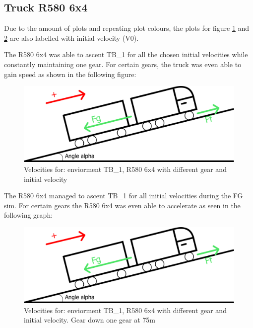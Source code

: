 \documentclass[noprint]{uit-thesis}
\begin{document}
\subsection{Truck R580 6x4}
Due to the amount of plots and repeating plot colours, the plots for figure \ref{fig:TB1_6x4} and \ref{fig:TB1_6x4_GR} are also labelled with initial velocity (V0). 
\par
The R580 6x4 was able to ascent TB\_1 for all the chosen initial velocities while constantly maintaining one gear. For certain gears, the truck was even able to gain speed as shown in the following figure:
\begin{figure}[H]
\includegraphics[width=\textwidth, height=0.37\textheight]{photo/freeBodyDiagram.png}
\caption{Velocities for: enviorment TB\_1, R580 6x4 with different gear and initial velocity}
\label{fig:TB1_6x4}
\end{figure}

The R580 6x4 managed to ascent TB\_1 for all initial velocities during the FG sim. For certain gears the R580 6x4 was even able to accelerate as seen in the following graph:
\begin{figure}[H]
\includegraphics[width=\textwidth, height=0.37\textheight]{photo/freeBodyDiagram.png}
\caption{Velocities for: enviorment TB\_1, R580 6x4 with different gear and initial velocity. Gear down one gear at 75m}
\label{fig:TB1_6x4_GR}
\end{figure}
\end{document}
